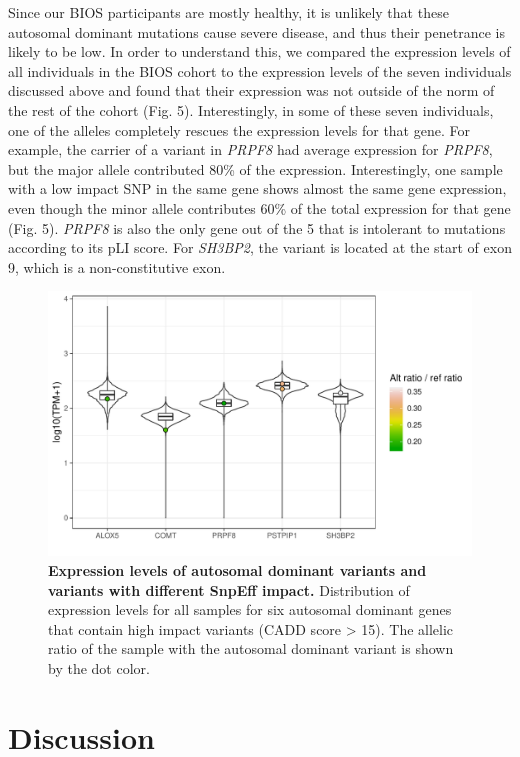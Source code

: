 Since our BIOS participants are mostly healthy, it is unlikely that these autosomal dominant mutations cause severe disease, and thus their penetrance is likely to be low. In order to understand this, we compared the expression levels of all individuals in the BIOS cohort to the expression levels of the seven individuals discussed above and found that their expression was not outside of the norm of the rest of the cohort (Fig. 5). Interestingly, in some of these seven individuals, one of the alleles completely rescues the expression levels for that gene. For example, the carrier of a variant in \emph{PRPF8} had average expression for \emph{PRPF8}, but the major allele contributed 80\% of the expression. Interestingly, one sample with a low impact SNP in the same gene shows almost the same gene expression, even though the minor allele contributes 60\% of the total expression for that gene (Fig. 5). \emph{PRPF8} is also the only gene out of the 5 that is intolerant to mutations according to its pLI score. For \emph{SH3BP2}, the variant is located at the start of exon 9, which is a non-constitutive exon. 

\begin{figure}[h!]
	\includegraphics[scale=0.1]{chapters/chapter3-allele-specific-expression/img/fig5.pdf}
	\caption{\textbf{Expression levels of autosomal dominant variants and variants with different SnpEff impact.} Distribution of expression levels for all samples for six autosomal dominant genes that contain high impact variants (CADD score > 15). The allelic ratio of the sample with the autosomal dominant variant is shown by the dot color.}
\end{figure}

\section{Discussion}

